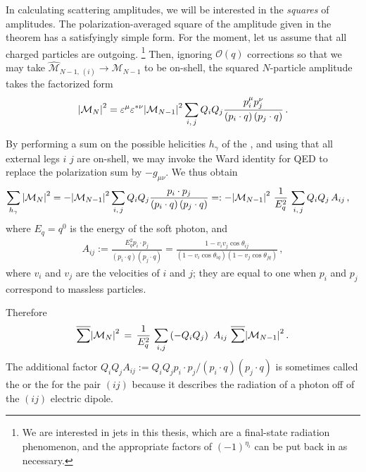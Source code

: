 \begin{example}
    \label{ex:qed-antennae}
    In calculating scattering amplitudes, we will be interested in the \textit{squares} of amplitudes.
    The polarization-averaged square of the amplitude given in the  theorem has a satisfyingly simple form.
    For the moment, let us assume that all charged particles are outgoing.%
    \footnote{
        We are interested in jets in this thesis, which are a final-state radiation phenomenon, and the appropriate factors of \((-1)^{\eta_i}\) can be put back in as necessary.
    }
    Then, ignoring \(\mathcal{O}(q)\) corrections so that we may take \(\widehat{\mathcal{M}}_{N-1,\,(i)} \to \mathcal{M}_{N-1}\) to be on-shell, the squared \(N\)-particle amplitude takes the factorized form
    \begin{align}
        \abs{\mathcal{M}_N}^2
        =
        \varepsilon^{\mu} \varepsilon^{*\nu}
        \abs{\mathcal{M}_{N-1}}^2
        \sum_{i,\,j}
        Q_i Q_j
        \frac{p_i^\mu p_j^\nu}
            {\left(p_i\cdot q\right)\left(p_j \cdot q\right)}
        \,.
    \end{align}

    By performing a sum on the possible helicities \(h_\gamma\) of the , and using that all external legs \(i\) \(j\) are on-shell, we may invoke the Ward identity for QED to replace the polarization sum by \(-g_{\mu\nu}\).
    We thus obtain
    \begin{align}
        \sum_{h_\gamma}
        \abs{\mathcal{M}_N}^2
        &=
        -\abs{\mathcal{M}_{N-1}}^2
        \sum_{i,\,j}
        Q_i Q_j
        \frac{p_i \cdot p_j}
            {\left(p_i\cdot q\right)\left(p_j \cdot q\right)}
        =:
        -
        \abs{\mathcal{M}_{N-1}}^2
        \,\,
        \frac{1}{E_q^2}
        \,
        \sum_{i,\,j}
        Q_i Q_j
        \,
        A_{ij}
        \,,
    \end{align}
    where \(E_q = q^0\) is the energy of the soft photon, and
    \begin{align}
        A_{ij}
        :=
        \frac{E_q^2 p_i \cdot p_j}{(p_i \cdot q)(p_j \cdot q)}
        =
        \frac{1 - v_i v_j \cos\theta_{ij}}{(1 - v_i \cos\theta_{iq})(1 - v_j \cos\theta_{jq})}
        \,,
    \end{align}
    where \(v_i\) and \(v_j\) are the velocities of \(i\) and \(j\);
    they are equal to one when \(p_i\) and \(p_j\) correspond to massless particles.

    Therefore
    \begin{align}
        \overline{\sum}
        \abs{\mathcal{M}_N}^2
        \,
        =
        \,
        \frac{1}{E_q^2}
        \,
        \sum_{i,j}
        \left(- Q_i Q_j\right)
        \,\,
        A_{ij}
        \,\,
        \overline{\sum}
        \abs{\mathcal{M}_{N-1}}^2
        \,.
    \end{align}
    The additional factor \(Q_i Q_j A_{ij} := Q_i Q_j p_i \cdot p_j / (p_i \cdot q) (p_j \cdot q)\) is sometimes called the  or the  for the pair \((ij)\) because it describes the radiation of a photon off of the \((ij)\) electric dipole.
\end{example}


